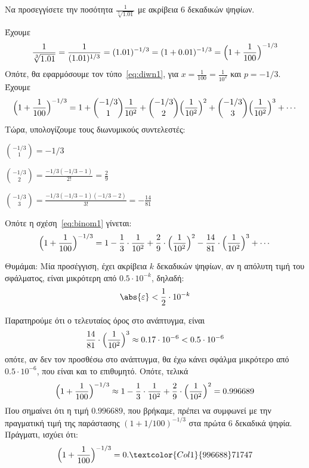 \documentclass[a4paper,table]{report}
\begin{document}
\begin{mybox3}
  \begin{example}
    Να προσεγγίσετε την ποσότητα $ \frac{1}{\sqrt[3]{1.01}} $ με ακρίβεια 6 δεκαδικών
    ψηφίων.
  \end{example}
\end{mybox3}
\begin{solution}
  Έχουμε 
  \[
    \frac{1}{\sqrt[3]{1.01}} = \frac{1}{(1.01)^{1/3}} = (1.01)^{-1/3} = (1+0.01)^{-1/3} =
    \Bigl(1+ \frac{1}{100} \Bigr)^{-1/3}
  \] 
  Οπότε, θα εφαρμόσουμε τον τύπο~\eqref{eq:diwn1}, για $ x= \frac{1}{100} =
  \frac{1}{10^{2}} $ και $ p=-1/3 $. Έχουμε
  \begin{equation}\label{eq:binom1}
    \Bigl(1+ \frac{1}{100} \Bigr)^{-1/3} = 1 +  \binom{-1/3}{1} \frac{1}{10^{2}} +
    \binom{-1/3}{2} \Bigl(\frac{1}{10^{2}}\Bigr)^{2} + \binom{-1/3}{3}
    \Bigl(\frac{1}{10^{2}} \Bigr)^{3} + \cdots
  \end{equation} 
  Τώρα, υπολογίζουμε τους διωνυμικούς συντελεστές:
  \begin{myitemize}
    \item $ \binom{-1/3}{1} = -1/3 $
    \item $ \binom{-1/3}{2} = \frac{-1/3(-1/3 -1)}{2!} = \frac{2}{9} $
    \item $ \binom{-1/3}{3} = \frac{-1/3(-1/3 -1)(-1/3 - 2)}{3!} =-\frac{14}{81} $ 
  \end{myitemize}
  Οπότε η σχέση~\eqref{eq:binom1} γίνεται:
  \begin{equation}
    \Bigl(1+ \frac{1}{100} \Bigr)^{-1/3} = 1 - \frac{1}{3} \cdot \frac{1}{10^{2}} +
    \frac{2}{9} \cdot \Bigl(\frac{1}{10^{2}}\Bigr)^{2} - \frac{14}{81} \cdot
    \Bigl(\frac{1}{10^{2}} \Bigr)^{3} + \cdots
  \end{equation}
  \begin{mybox1}
  \item {}
    \textcolor{Col1}{Θυμάμαι:} Μία προσέγγιση, έχει ακρίβεια $k$ δεκαδικών ψηφίων, αν 
    η απόλυτη τιμή του σφάλματος, είναι μικρότερη από $ 0.5 \cdot 10^{-k} $, δηλαδή:
    \[
      \abs{\varepsilon} < \frac{1}{2} \cdot 10^{-k} 
    \]
  \end{mybox1}
  Παρατηρούμε ότι ο τελευταίος όρος στο ανάπτυγμα, είναι 
  \[
    \frac{14}{81} \cdot \Bigl(\frac{1}{10^{2}} \Bigr)^{3} \approx 0.17 \cdot 10^{-6} < 0.5 \cdot
    10^{-6}
  \] 
  οπότε, αν δεν τον προσθέσω στο ανάπτυγμα, θα έχω κάνει σφάλμα μικρότερο από $ 0.5
  \cdot 10^{-6} $, που είναι και το επιθυμητό.
  Οπότε, τελικά
  \[
    \Bigl(1+ \frac{1}{100} \Bigr)^{-1/3} \approx 1 - \frac{1}{3} \cdot \frac{1}{10^{2}} +
    \frac{2}{9} \cdot \Bigl(\frac{1}{10^{2}}\Bigr)^{2} = 0.996689
  \]
  Που σημαίνει ότι η τιμή $ 0.996689 $, που βρήκαμε, πρέπει να συμφωνεί με την 
  πραγματική τιμή της παράστασης $(1+ 1/{100})^{-1/3} $ στα πρώτα 6 
  δεκαδικά ψηφία. Πράγματι, ισχύει ότι:
  \[
    \Bigl(1+ \frac{1}{100} \Bigr)^{-1/3} = 0.\textcolor{Col1}{996688}71747
  \] 
\end{solution}
\end{document}
